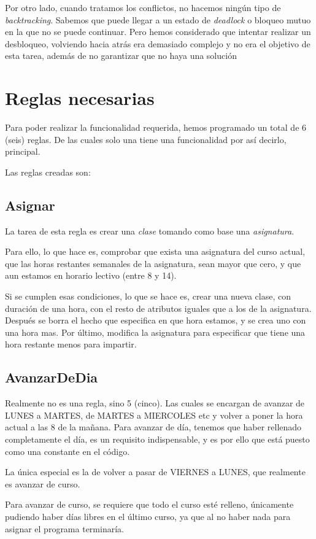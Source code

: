\documentclass{report}
\begin{document}
Por otro lado, cuando tratamos los conflictos, no hacemos ning\'{u}n tipo de \emph{backtracking}. Sabemos que 
puede llegar a un estado de \emph{deadlock} o bloqueo mutuo en la que no se puede continuar. Pero hemos considerado
que intentar realizar un desbloqueo, volviendo hacia atr\'{a}s era demasiado complejo y no era el objetivo de esta
tarea, adem\'{a}s de no garantizar que no haya una soluci\'{o}n

\section{Reglas necesarias}
Para poder realizar la funcionalidad requerida, hemos programado un total de 6 (seis) reglas. De las cuales solo
una tiene una funcionalidad por as\'{i} decirlo, principal.

Las reglas creadas son:
\subsection{Asignar}
La tarea de esta regla es crear una \emph{clase} tomando como base una \emph{asignatura}.

Para ello, lo que hace es, comprobar que exista una asignatura del curso actual, que las horas restantes semanales
de la asignatura, sean mayor que cero, y que aun estamos en horario lectivo (entre 8 y 14).

Si se cumplen esas condiciones, lo que se hace es, crear una nueva clase, con duraci\'{o}n de una hora, con el resto de
atributos iguales que a los de la asignatura. Despu\'{e}s se borra el hecho que especifica en que hora estamos, y
se crea uno con una hora mas. Por \'{u}ltimo, modifica la asignatura para especificar que tiene una hora restante
menos para impartir.

\subsection{AvanzarDeDia}
Realmente no es una regla, sino 5 (cinco). Las cuales se encargan de avanzar de LUNES a MARTES, de MARTES a MIERCOLES
etc y volver a poner la hora actual a las 8 de la ma\~{n}ana. Para avanzar de d\'{i}a, tenemos que haber rellenado
completamente el d\'{i}a, es un requisito indispensable, y es por ello que est\'{a} puesto como una constante en
el c\'{o}digo.

La \'{u}nica especial es la de volver a pasar de VIERNES a LUNES, que realmente es avanzar de curso.

Para avanzar de curso, se requiere que todo el curso est\'{e} relleno, \'{u}nicamente pudiendo haber
d\'{i}as libres en el \'{u}ltimo curso, ya que al no haber nada para asignar el programa terminar\'{i}a.
\end{document}
